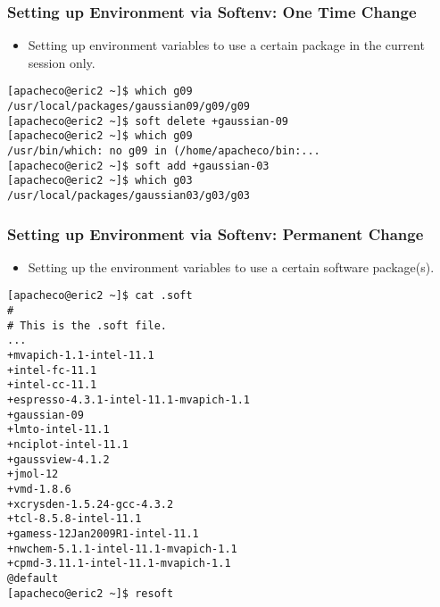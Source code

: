 \documentclass[slidestop,mathserif,compress,xcolor=svgnames,table]{beamer}
\begin{document}
\begin{frame}[fragile]
  \frametitle{\footnotesize Setting up Environment via Softenv: One Time Change}
  \begin{itemize}
    \item Setting up environment variables to use a certain package in the current session only.
  \end{itemize}
  {\tiny
  \begin{alertblock}{}
    \begin{verbatim}
[apacheco@eric2 ~]$ which g09
/usr/local/packages/gaussian09/g09/g09
[apacheco@eric2 ~]$ soft delete +gaussian-09
[apacheco@eric2 ~]$ which g09
/usr/bin/which: no g09 in (/home/apacheco/bin:...
[apacheco@eric2 ~]$ soft add +gaussian-03
[apacheco@eric2 ~]$ which g03
/usr/local/packages/gaussian03/g03/g03
    \end{verbatim}
  \end{alertblock}
  }
\end{frame}

\begin{frame}[fragile]
  \frametitle{\footnotesize Setting up Environment via Softenv: Permanent Change}
  \begin{itemize}
    \item Setting up the environment variables to use a certain software package(s).
  \end{itemize}
  {\tiny
  \begin{alertblock}{}
    \begin{verbatim}
[apacheco@eric2 ~]$ cat .soft
#   
# This is the .soft file.
...
+mvapich-1.1-intel-11.1
+intel-fc-11.1
+intel-cc-11.1
+espresso-4.3.1-intel-11.1-mvapich-1.1
+gaussian-09
+lmto-intel-11.1
+nciplot-intel-11.1
+gaussview-4.1.2
+jmol-12
+vmd-1.8.6
+xcrysden-1.5.24-gcc-4.3.2
+tcl-8.5.8-intel-11.1
+gamess-12Jan2009R1-intel-11.1
+nwchem-5.1.1-intel-11.1-mvapich-1.1
+cpmd-3.11.1-intel-11.1-mvapich-1.1
@default
[apacheco@eric2 ~]$ resoft
    \end{verbatim}
  \end{alertblock}
  }
\end{frame}
\end{document}
